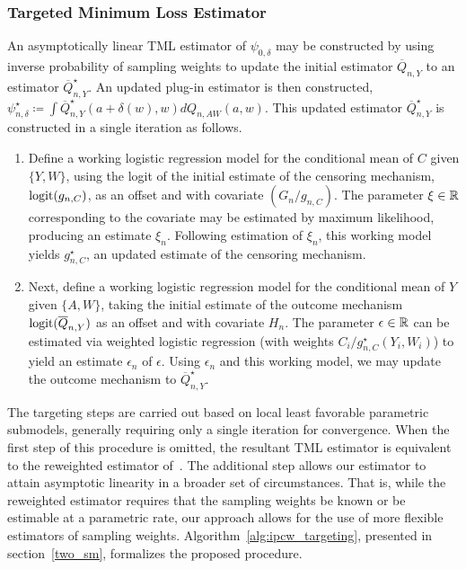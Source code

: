 \subsubsection{Targeted Minimum Loss Estimator}\label{tmle}

An asymptotically linear TML estimator of $\psi_{0,\delta}$ may be constructed
by using inverse probability of sampling weights to update the initial estimator
$\overline{Q}_{n,Y}$ to an estimator $\overline{Q}_{n,Y}^{\star}$. An updated
plug-in estimator is then constructed, $\psi_{n,\delta}^{\star} \coloneqq \int
\overline{Q}_{n,Y}^{\star}(a + \delta(w), w) dQ_{n,AW}(a,w)$. This updated
estimator $\overline{Q}_{n,Y}^{\star}$ is constructed in a single iteration as
follows.
\begin{enumerate}[leftmargin=1cm]
 \item Define a working logistic regression model for the conditional mean
     of $C$ given $\{Y, W\}$, using the logit of the initial estimate of the
     censoring mechanism, $\operatorname{logit}(g_{n,C})$, as an offset and with covariate
     $(G_n / g_{n,C})$. The parameter $\xi \in \mathbb{R}$ corresponding to the
     covariate may be estimated by maximum likelihood, producing an estimate
     $\xi_n$. Following estimation of $\xi_n$, this working model yields
     $g_{n,C}^{\star}$, an updated estimate of the censoring mechanism.
 \item Next, define a working logistic regression model for the conditional mean
     of $Y$ given $\{A,W\}$, taking the initial estimate of the outcome mechanism
     $\operatorname{logit}(\overline{Q}_{n,Y})$ as an offset and with covariate $H_n$. The
     parameter $\epsilon \in \mathbb{R}$ can be estimated via weighted logistic regression
     (with weights $C_i / g^{\star}_{n,C}(Y_i,W_i)$) to yield an estimate
     $\epsilon_n$ of $\epsilon$. Using $\epsilon_n$ and this working model, we may
     update the outcome mechanism to $\overline{Q}_{n,Y}^{\star}$.
\end{enumerate}

The targeting steps are carried out based on local least favorable parametric
submodels, generally requiring only a single iteration for convergence. When the
first step of this procedure is omitted, the resultant TML estimator is
equivalent to the reweighted estimator of~\citet{rose2011targeted2sd}. The
additional step allows our estimator to attain asymptotic linearity in a broader
set of circumstances. That is, while the reweighted estimator requires that the
sampling weights be known or be estimable at a parametric rate, our approach
allows for the use of more flexible estimators of sampling weights.
Algorithm~\ref{alg:ipcw_targeting}, presented in
section~\ref{two_sm}, formalizes the proposed procedure.

